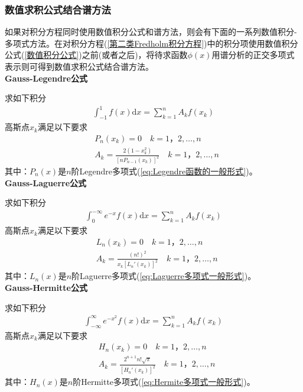 		\subsubsection{数值求积公式结合谱方法}
			\label{subsubsec:数值求积公式结合谱方法}
			\par
			如果对积分方程同时使用数值积分公式和谱方法，则会有下面的一系列数值积分-多项式方法。在对积分方程(\ref{第二类Fredholm积分方程})中的积分项使用数值积分公式(\ref{数值积分公式})之前(或者之后)，将待求函数$\phi(x)$用谱分析的正交多项式表示则可得到数值求积公式结合谱方法。\\
			\textbf{Gauss-Legendre公式}
			\par
			求如下积分
			\begin{align*}
				\int_{-1}^1 f(x) \mathrm{d}x = \sum_{k = 1}^n A_k f(x_k)
			\end{align*}
			高斯点$x_k$满足以下要求
			\begin{align*}
				&P_n(x_k) = 0 \quad k = 1，2,\dots,n\\
				&A_k = \frac{2(1-x_k^2)}{[nP_{n-1}(x_k)]^2}\quad k = 1，2,\dots,n
			\end{align*}
			其中：$P_n(x)$是$n$阶Legendre多项式(\ref{eq:Legendre函数的一般形式})。\\
			\textbf{Gauss-Laguerre公式}
			\par
			求如下积分
			\begin{align*}
				\int_{0}^{-\infty} e^{-x}f(x) \mathrm{d}x = \sum_{k = 1}^n A_k f(x_k)
			\end{align*}
			高斯点$x_k$满足以下要求
			\begin{align*}
				&L_n(x_k) = 0 \quad k = 1，2,\dots,n\\
				&A_k = \frac{(n!)^2}{x_k[L_n'(x_k)]^2}\quad k = 1，2,\dots,n
			\end{align*}
			其中：$L_n(x)$是$n$阶Laguerre多项式(\ref{eq:Laguerre多项式一般形式})。\\
			\textbf{Gauss-Hermitte公式}
			\par
			求如下积分
			\begin{align*}
				\int_{-\infty}^{\infty} e^{-x^2}f(x) \mathrm{d}x = \sum_{k = 1}^n A_k f(x_k)
			\end{align*}
			高斯点$x_k$满足以下要求
			\begin{align*}
				&H_n(x_k) = 0 \quad k = 1，2,\dots,n\\
				&A_k = \frac{2^{n+1}n!\sqrt{\pi}}{[H_n'(x_k)]^2}\quad k = 1，2,\dots,n
			\end{align*}
			其中：$H_n(x)$是$n$阶Hermitte多项式(\ref{eq:Hermite多项式一般形式})。\\
